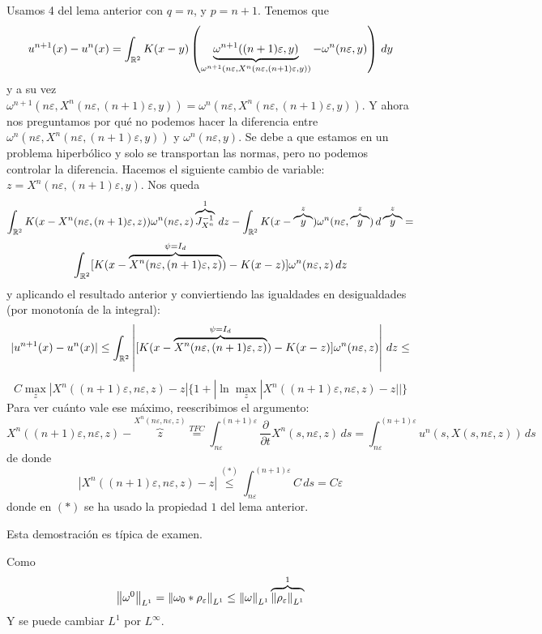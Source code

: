 Usamos 4 del lema anterior con $q = n$, y $p = n+1$. Tenemos que 
$$u^{n+1}(x) - u^n(x) = \int_{\mathbb{R}^2} K(x-y) \left( 
\underbrace{\omega^{n+1} ((n+1)\varepsilon, y)}_{\omega^{n+1}(n \varepsilon, X^n(n \varepsilon, (n+1)\varepsilon, y))} - \omega^{n} (n\varepsilon, y) \right)\,dy$$
y a su vez $\omega^{n+1}(n \varepsilon, X^n(n \varepsilon, (n+1)\varepsilon, y)) = \omega^{n}(n \varepsilon, X^n(n \varepsilon, (n+1)\varepsilon, y))$. Y ahora nos preguntamos 
por qué no podemos hacer la diferencia entre $\omega^{n}(n \varepsilon, X^n(n \varepsilon, (n+1)\varepsilon, y))$ y $\omega^n(n\varepsilon, y)$.
Se debe a que estamos en un problema hiperbólico y solo se transportan las normas, pero no podemos controlar la diferencia. Hacemos el siguiente 
cambio de variable: $z = X^n(n \varepsilon, (n+1)\varepsilon, y)$. Nos queda 
$$\int_{\mathbb{R}^2} K(x - X^n(n \varepsilon, (n+1)\varepsilon, z)) \omega^n(n \varepsilon, z) \overbrace{J^{-1}_{X^n}}^{1}\,dz - 
\int_{\mathbb{R}^2} K(x - \overbrace{y}^{z}) \omega^n(n \varepsilon, \overbrace{y}^{z})\,d\overbrace{y}^{z} = $$
$$\int_{\mathbb{R}^2} [K(x - \overbrace{X^n(n \varepsilon, (n+1)\varepsilon, z)}^{\psi = I_d}) - K(x-z)] \omega^n(n \varepsilon, z) \,dz$$
y aplicando el resultado anterior y conviertiendo las igualdades en desigualdades (por monotonía de la integral):
$$|u^{n+1}(x) - u^n(x)| \leq \int_{\mathbb{R}^2} 
\left| [K(x - \overbrace{X^n(n \varepsilon, (n+1)\varepsilon, z)}^{\psi = I_d}) - K(x-z)] \omega^n(n \varepsilon, z) \right|\,dz \leq$$
$$C \max_{z} |X^n((n+1)\varepsilon, n \varepsilon, z) - z| \{1 + |\ln \max_z |X^n((n+1)\varepsilon, n \varepsilon, z) - z||\}$$
Para ver cuánto vale ese máximo, reescribimos el argumento:
$$X^n((n+1)\varepsilon, n \varepsilon, z) - \overbrace{z}^{X^n(n \varepsilon, n \varepsilon, z)} \stackrel{TFC}{=} 
\int_{n \varepsilon}^{(n+1)\varepsilon} \dfrac{\partial}{\partial t} X^n(s, n \varepsilon, z)\,ds = 
\int_{n \varepsilon}^{(n+1)\varepsilon} u^n(s, X(s, n \varepsilon, z))\,ds$$
de donde
$$|X^n((n+1)\varepsilon, n \varepsilon, z) - z| \stackrel{(*)}{\leq} \int_{n \varepsilon}^{(n+1)\varepsilon} C \,ds = C \varepsilon$$
donde en $(*)$ se ha usado la propiedad $1$ del lema anterior. \\

\begin{observacion}
    Esta demostración es típica de examen.
\end{observacion}


Como $$\left\lVert \omega^0 \right\rVert_{L^1} = \left\lVert \omega_0 \ast \rho_\varepsilon \right\rVert_{L^1} \leq \left\lVert \omega \right\rVert_{L^1} \overbrace{\left\lVert \rho_\varepsilon \right\rVert_{L^1}}^{1}$$
Y se puede cambiar $L^1$ por $L^\infty$. \\

